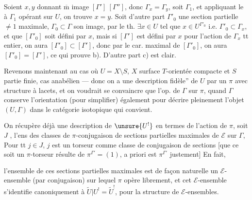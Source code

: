 Soient \(x,y\) donnant \(\overline{\mathrm m}\) image
\([\Gamma']\ [\Gamma'']\), donc \(\Gamma_x=\Gamma_y\), soit \(\Gamma_1\),
et appliquant le  à \(\Gamma_1\) opérant sur \(U\),
on trouve \(x=y\).
Soit d'autre part \(\Gamma'_0\) une section partielle \(\ne1\) maximale,
\(\Gamma_0\subset\Gamma\) son image,
par le th. 
\(\exists x\in U\)  tel que
\(x\in U^{\Gamma'_0}\) i.e. \(\Gamma'_0\subset\Gamma_x\),
et que \([\Gamma'_0]\) soit défini par \(x\),
mais si \([\Gamma']\) est défini par \(x\) pour l'action de
\(\Gamma_x\) tt entier, on aura \([\Gamma'_0]\subset[\Gamma']\),
donc par le car. maximal de \([\Gamma'_0]\), on aura
\([\Gamma'_0]=[\Gamma']\), ce  qui prouve b).
D'autre part c) est clair.


Revenons maintenant au cas où \(U=X\setminus S\), \(X\) surface
\(T\)-orientée compacte et \(S\) partie
finie, cas anabélien --- donc on a une description
 fidèle'' de \(U\) par un \(\pi\) avec
structure à lacets, et on voudrait se convaincre
que  l'op.  de \(\Gamma\)
sur \(\pi\), quand \(\Gamma\) conserve l'orientation (pour simplifier)
également  pour décrire pleinement l'objet
\((U,\Gamma)\) dans le catégorie isotopique qui convient.

On récupère déjà une description de \(\unsure{U^!}\) en termes de
l'action de \(\pi\), soit \(J\) ,
l'ens des classes de \(\pi\)-conjugaison
de sections partielles  maximales de
\(\mathcal E\) sur \(\Gamma\),
Pour tt \(j\in J\), \(j\) est un \inserted{\(\pi\)-}torseur
comme
classe de \inserted{\(\pi\)-}conjugaison de sections
[que ce soit un \(\pi\)-torseur résulte de
\(\pi^{\Gamma'}=(1)\), a priori
est \(\pi^{\Gamma'}\) justement]
En fait,


l'ensemble de  ces  sections
partielles maximales est de façon naturelle un \(\mathcal E\)-ensemble
(par conjugaison)  sur lequel \(\pi\) opère librement, et cet
\(\mathcal E\)-ensemble s'identifie canoniquement à
\(\widetilde U|U^!=\widetilde U^!\), pour la structure de
\(\mathcal E\)-ensembles.

